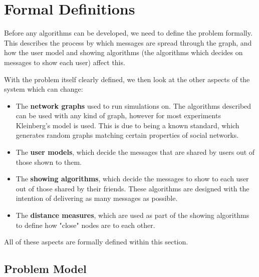 \documentclass[bsc,frontabs,twoside,singlespacing,parskip,deptreport]{infthesis}     %
\begin{document}
\chapter{Formal Definitions}

Before any algorithms can be developed, we need to define the problem formally. This describes the process by which messages are spread through the graph, and how the user model and showing algorithms (the algorithms which decides on messages to show each user) affect this.

With the problem itself clearly defined, we then look at the other aspects of the system which can change:
\begin{itemize}
\item The \textbf{network graphs} used to run simulations on. The algorithms described can be used with any kind of graph, however for most experiments Kleinberg's model is used. This is due to being a known standard, which generates random graphs matching certain properties of social networks.
\item The \textbf{user models}, which decide the messages that are shared by users out of those shown to them.
\item The \textbf{showing algorithms}, which decide the messages to show to each user out of those shared by their friends. These algorithms are designed with the intention of delivering as many messages as possible.
\item The \textbf{distance measures}, which are used as part of the showing algorithms to define how "close" nodes are to each other.
\end{itemize}

All of these aspects are formally defined within this section.

\section{Problem Model}
\end{document}
